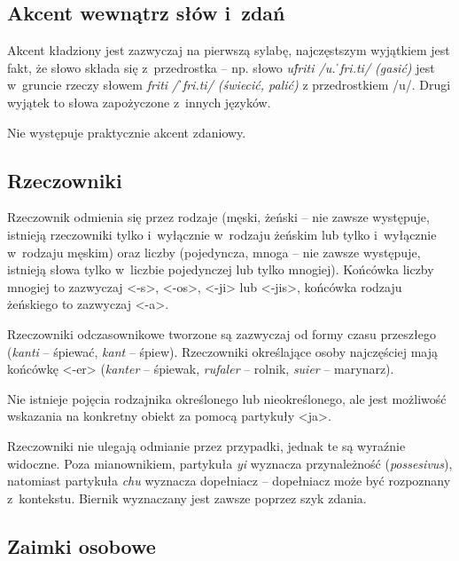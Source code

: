 \begin{spacing}{1.1}
\subsection{Akcent wewnątrz słów i~zdań}

Akcent kładziony jest zazwyczaj na pierwszą sylabę, najczęstszym wyjątkiem jest 
fakt, że słowo składa się z~przedrostka -- np. słowo \emph{uf́riti /u.ˈfri.ti/ 
(gasić)} jest w~gruncie rzeczy słowem \emph{friti /ˈfri.ti/ (świecić, palić)} 
z przedrostkiem /u/. Drugi wyjątek to słowa zapożyczone z~innych języków.

Nie występuje praktycznie akcent zdaniowy.

\subsection{Rzeczowniki}
Rzeczownik odmienia się przez rodzaje (męski, żeński -- nie zawsze występuje, 
istnieją rzeczowniki tylko i~wyłącznie w~rodzaju żeńskim lub tylko i~wyłącznie 
w~rodzaju męskim) oraz liczby (pojedyncza, mnoga -- nie zawsze występuje, 
istnieją słowa tylko w~liczbie pojedynczej lub tylko mnogiej). Końcówka liczby 
mnogiej to zazwyczaj <-s>, <-os>, <-ji> lub <-jis>, końcówka rodzaju żeńskiego 
to zazwyczaj <-a>.

Rzeczowniki odczasownikowe tworzone są zazwyczaj od formy czasu przeszłego 
(\emph{kanti} -- śpiewać, \emph{kant} -- śpiew). Rzeczowniki określające osoby 
najczęściej mają końcówkę <-er> (\emph{kanter} -- śpiewak, \emph{rufaler} -- 
rolnik, \emph{suier} -- marynarz).

Nie istnieje pojęcia rodzajnika określonego lub nieokreślonego, ale jest 
możliwość wskazania na konkretny obiekt za pomocą partykuły <ja>.


Rzeczowniki nie ulegają odmianie przez przypadki, jednak te są wyraźnie 
widoczne. Poza mianownikiem, partykuła \emph{yi} wyznacza przynależność 
(\emph{possesivus}), natomiast partykuła \emph{chu} wyznacza dopełniacz -- 
dopełniacz może być rozpoznany z~kontekstu. Biernik wyznaczany jest zawsze 
poprzez szyk zdania.


\subsection{Zaimki osobowe}


\end{spacing}
